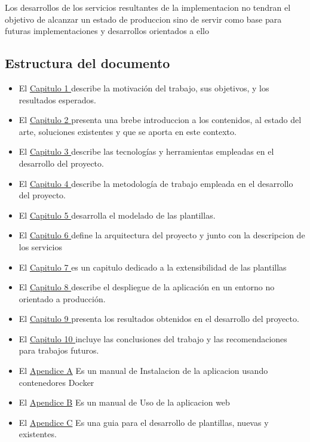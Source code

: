 \documentclass[12pt, a4paper, twoside]{article}
\begin{document}
Los desarrollos de los servicios resultantes de la implementacion no tendran el objetivo de alcanzar un estado de produccion sino de servir como base para futuras implementaciones y desarrollos orientados a ello 

\subsection{Estructura del documento}

\begin{itemize}[label=\textbullet]
	\item El \hyperref[sec:Introduccion]{Capitulo 1 } describe la motivación del trabajo, sus objetivos, y los resultados esperados.
	\item El \hyperref[sec:Estado del Arte]{Capitulo 2 } presenta una brebe introduccion a los contenidos, al estado del arte, soluciones existentes y que se aporta en este contexto.
	\item El \hyperref[sec:Tecnologias Empleadas]{Capitulo 3 } describe las tecnologías y herramientas empleadas en el desarrollo del proyecto.
	\item El \hyperref[sec:Metodologia]{Capitulo 4 } describe la metodología de trabajo empleada en el desarrollo del proyecto.
	\item El \hyperref[sec:Modelado de las plantillas]{Capitulo 5 } desarrolla el modelado de las plantillas.
	\item El \hyperref[sec:Arquitectura y Descripción del sistema]{Capitulo 6 } define la arquitectura del proyecto y junto con la descripcion de los servicios
	\item El \hyperref[sec:Extensibilidad]{Capitulo 7 } es un capitulo dedicado a la extensibilidad de las plantillas
	\item El \hyperref[sec:Despliegue de la aplicación]{Capitulo 8 }  describe el despliegue de la aplicación en un entorno no orientado a producción.
	\item El \hyperref[sec:Resultados]{Capitulo 9 } presenta los resultados obtenidos en el desarrollo del proyecto.
	\item El \hyperref[sec:Conclusiones]{Capitulo 10 } incluye las conclusiones del trabajo y las recomendaciones para trabajos futuros.
	\item El \hyperref[sec:Manual de Instalación]{Apendice A} Es un manual de Instalacion de la aplicacion usando contenedores Docker
	\item El \hyperref[sec:Manual de Uso]{Apendice B} Es un manual de Uso de la aplicacion web
	\item El \hyperref[sec:Manual de Desarrollo]{Apendice C} Es una guia para el desarrollo de plantillas, nuevas y existentes.
\end{itemize}
\end{document}
